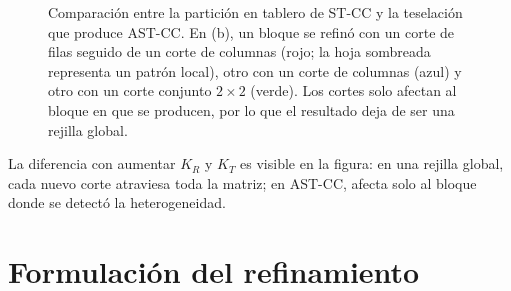 \begin{figure}[t]
\centering
{}
\caption{Comparación entre la partición en tablero de ST-CC y la teselación que
produce AST-CC. En (b), un bloque se refinó con un corte de filas seguido de un
corte de columnas (rojo; la hoja sombreada representa un patrón local), otro con
un corte de columnas (azul) y otro con un corte conjunto $2\times 2$ (verde).
Los cortes solo afectan al bloque en que se producen, por lo que el resultado
deja de ser una rejilla global.}
\label{fig:prop-teselacion}
\end{figure}

La diferencia con aumentar $K_R$ y $K_T$ es visible en la figura: en una
rejilla global, cada nuevo corte atraviesa toda la matriz; en AST-CC, afecta
solo al bloque donde se detectó la heterogeneidad.

\section{Formulación del refinamiento}\label{sec:prop-formulacion}


